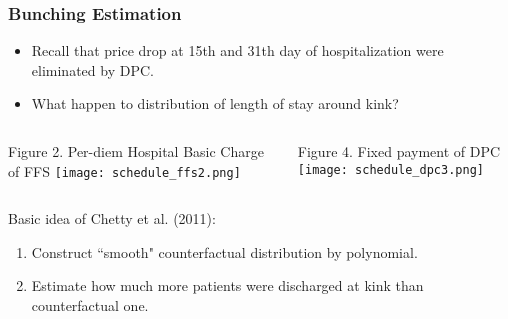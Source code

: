 \documentclass[14pt]{beamer}
\begin{document}
\begin{frame}[allowframebreaks]
\frametitle{Bunching Estimation}
\begin{itemize}
\item Recall that price drop at 15th and 31th day of hospitalization were eliminated by DPC.
\item What happen to distribution of length of stay around kink?
\end{itemize}

\begin{columns}
  \begin{column}{0.5 \textwidth}
    \begin{center}
    {\tiny Figure 2. Per-diem Hospital Basic Charge of FFS}
    \texttt{[image: schedule\_ffs2.png]}
    \end{center}
  \end{column}

  \begin{column}{0.5 \textwidth}
    \begin{center}
    {\tiny Figure 4. Fixed payment of DPC}
    \texttt{[image: schedule\_dpc3.png]}
    \end{center}
  \end{column}
\end{columns}
    
\framebreak

Basic idea of Chetty et al. (2011):
\begin{enumerate}
\item Construct ``smooth" counterfactual distribution by polynomial.
\item Estimate how much more patients were discharged at kink than counterfactual one.
\end{enumerate}


\framebreak

\end{frame}
\end{document}
